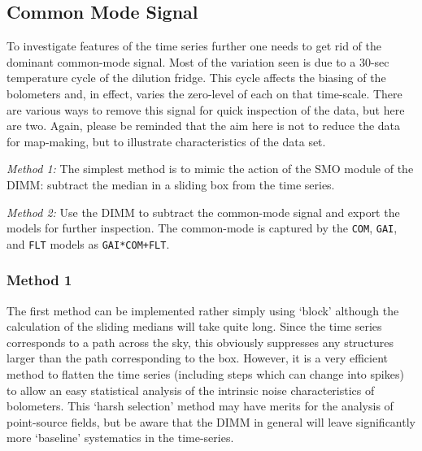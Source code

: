 \documentclass[twoside,11pt]{starlink}
\begin{document}
\subsection{Common Mode Signal}
\label{sec:commonmode}

To investigate features of the time series further one needs to get
rid of the dominant common-mode signal. Most of the variation seen is
due to a 30-sec temperature cycle of the dilution fridge. This cycle
affects the biasing of the bolometers and, in effect, varies the
zero-level of each on that time-scale. There are various ways to
remove this signal for quick inspection of the data, but here are two.
Again, please be reminded that the aim here is not to reduce the data
for map-making, but to illustrate characteristics of the data set.

\textsl{Method 1:} The simplest method is to mimic the action of the SMO module
of the DIMM: subtract the median in a sliding box from the time
series.

\textsl{Method 2:} Use the DIMM to subtract the common-mode signal and
export the models for further inspection. The common-mode is captured
by the \texttt{COM}, \texttt{GAI}, and \texttt{FLT} models as
\texttt{GAI*COM+FLT}.

\subsubsection{Method 1}
\label{sec:method1}

The first method can be implemented rather simply using `block'
although the calculation of the sliding medians will take quite
long. Since the time series corresponds to a path across the sky, this
obviously suppresses any structures larger than the path corresponding
to the box. However, it is a very efficient method to flatten the time
series (including steps which can change into spikes) to allow an easy
statistical analysis of the intrinsic noise characteristics of
bolometers.  This `harsh selection' method may have merits for the
analysis of point-source fields, but be aware that the DIMM
in general will leave significantly more `baseline' systematics in the
time-series.

\end{document}
